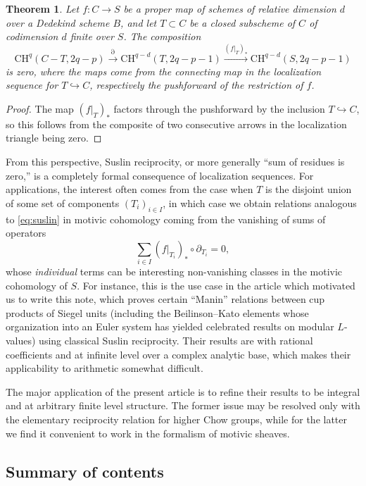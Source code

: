 \documentclass[a4paper,reqno,11pt]{amsart}
\theoremstyle{plain}
\newtheorem{theorem}{Theorem}[section]
\theoremstyle{definition}
\theoremstyle{remark}
\newcommand{\CH}{{\mathrm{CH}}}
\begin{document}
\begin{theorem} \label{thm:naive}
    Let $f:C\to S$ be a proper map of schemes of relative dimension $d$ over a Dedekind scheme $B$, and let $T\subset C$ be a closed subscheme of $C$ of codimension $d$ finite over $S$. The composition
    \[
        \CH^q(C-T, 2q-p)\xrightarrow{\partial} \CH^{q-d}(T,2q-p-1) \xrightarrow{(f|_T)_*} \CH^{q-d}(S, 2q-p-1)
    \]
    is zero, where the maps come from the connecting map in the localization sequence for $T\hookrightarrow C$, respectively the pushforward of the restriction of $f$. 
\end{theorem}
\begin{proof}
    The map $(f|_T)_*$ factors through the pushforward by the inclusion $T\hookrightarrow C$, so this follows from the composite of two consecutive arrows in the localization triangle being zero.
\end{proof}

From this perspective, Suslin reciprocity, or more generally ``sum of residues is zero,'' is a completely formal consequence of localization sequences. For applications, the interest often comes from the case when $T$ is the disjoint union of some set of components $(T_i)_{i\in I}$, in which case we obtain relations analogous to \eqref{eq:suslin} in motivic cohomology coming from the vanishing of sums of operators
\[
\sum_{i\in I} (f|_{T_i})_* \circ \partial_{T_i}=0,
\]
whose \emph{individual} terms can be interesting non-vanishing classes in the motivic cohomology of $S$. For instance, this is the use case in the article  \cite{BPPS} which motivated us to write this note, which proves certain ``Manin'' relations between cup products of Siegel units (including the Beilinson--Kato elements whose organization into an Euler system has yielded celebrated results on modular $L$-values) using classical Suslin reciprocity. Their results are with rational coefficients and at infinite level over a complex analytic base, which makes their applicability to arithmetic somewhat difficult.

The major application of the present article is to refine their results to be integral and at arbitrary finite level structure. The former issue may be resolved only with the elementary reciprocity relation for higher Chow groups, while for the latter we find it convenient to work in the formalism of motivic sheaves.

\subsection{Summary of contents}
\end{document}
